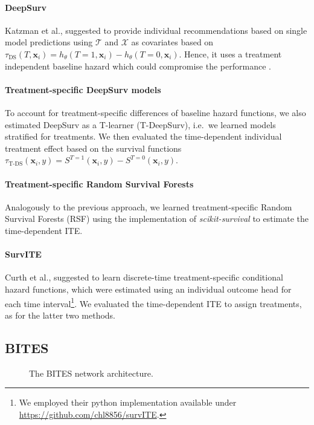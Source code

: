 \documentclass{article}
\newcommand{\myvec}[1]{\boldsymbol{#1}}
\begin{document}
	\paragraph{DeepSurv}
	Katzman et al.,  suggested to provide individual recommendations based on single model predictions using $\mathcal{T}$ and $\mathcal{X}$ as covariates based on 	
	$\tau_{\text{DS}}(T,\myvec{x}_i)=h_\theta(T=1,\myvec{x}_i)-h_\theta(T=0,\myvec{x}_i)$. Hence, it uses a treatment independent baseline hazard which could compromise the performance \cite{Bellera.2010,Xue.2013}. 
	
	\paragraph{Treatment-specific DeepSurv models}
	To account for treatment-specific differences of baseline hazard functions, we also estimated DeepSurv as a T-learner (T-DeepSurv), i.e.~we learned models stratified for treatments. We then evaluated the time-dependent individual treatment effect based on the survival functions $\tau_{\text{T-DS}}(\myvec{x}_i,y)=S^{T=1}(\myvec{x}_i,y)-S^{T=0}(\myvec{x}_i,y)$.
	
	
	\paragraph{Treatment-specific Random Survival Forests} Analogously to the previous approach, we learned treatment-specific Random Survival Forests (RSF) \cite{Ishwaran.2008,Athey.2016} using the implementation of \textit{scikit-survival} \cite{Polsterl.2020} to estimate the time-dependent ITE.
	
	\paragraph{SurvITE}
	Curth et al.,  suggested to learn discrete-time treatment-specific conditional hazard functions, which were estimated using an individual outcome head for each time interval\footnote{We employed their python implementation available under \url{https://github.com/chl8856/survITE}.}. We evaluated the time-dependent ITE to assign treatments, as for the latter two methods.
	
	\subsection{BITES}
	\begin{figure}
		\begin{center}
			\resizebox{\linewidth}{!}{
			}
			\caption{The BITES network architecture. \label{fig:BITES}}
		\end{center}
	\end{figure}
	
\end{document}
